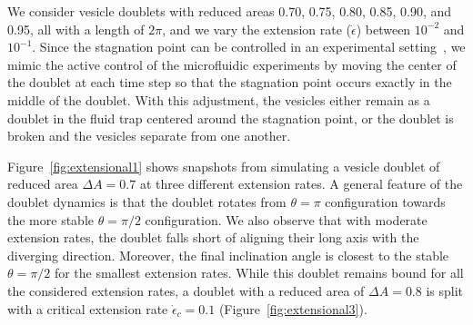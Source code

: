 \documentclass[prf,superscriptaddress,showkeys,longbibliography]{revtex4-1}
\begin{document}
We consider vesicle doublets with reduced areas 0.70, 0.75, 0.80, 0.85,
0.90, and 0.95, all with a length of $2\pi$, and we vary the extension
rate ($\dot\epsilon$) between $10^{-2}$ and $10^{-1}$.  Since the
stagnation point can be controlled in an experimental
setting~\cite{BentleyLeal1986_JFMa,Johnson-Chavarria2011_EMJ}, we mimic
the active control of the microfluidic experiments by moving the center
of the doublet at each time step so that the stagnation point occurs
exactly in the middle of the doublet.  With this adjustment, the
vesicles either remain as a doublet in the fluid trap centered around
the stagnation point, or the doublet is broken and the vesicles separate
from one another.  

Figure~\ref{fig:extensional1} shows snapshots from simulating a vesicle
doublet of reduced area  $\Delta A = 0.7$ at three different extension
rates. A general feature of the doublet dynamics is that the doublet
rotates from $\theta=\pi$ configuration towards the more stable
$\theta=\pi/2$ configuration.  We also observe that with moderate
extension rates, the doublet falls short of aligning their long axis
with the diverging direction.  Moreover, the final inclination angle is
closest to the stable $\theta=\pi/2$ for the smallest extension rates.
While this doublet remains bound for all the considered extension rates,
a doublet with a reduced area of $\Delta A = 0.8$ is split with a
critical extension rate $\dot\epsilon_c = 0.1$
(Figure~\ref{fig:extensional3}).  
\end{document}
